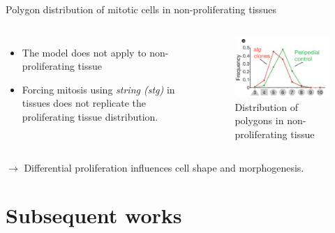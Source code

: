 \documentclass[aspectratio=169, 10pt]{beamer}
\begin{document}
\begin{frame}[fragile]{Polygon distribution of mitotic cells in non-proliferating tissues}
  \begin{columns}[onlytextwidth]
    \begin{itemize}
        \item The model does not apply to non-proliferating tissue
        \item Forcing mitosis using \textit{string (stg)} in tissues does not replicate the proliferating tissue distribution.
    \end{itemize}
    \begin{figure}
      \centering
      \includegraphics[width=\textwidth]{presentation/figures/fig3e.png}
      \caption{Distribution of polygons in non-proliferating tissue}
    \end{figure}
  \end{columns}
  $\rightarrow$ Differential proliferation influences cell shape and morphogenesis.
\end{frame}

\section{Subsequent works}
\end{document}
